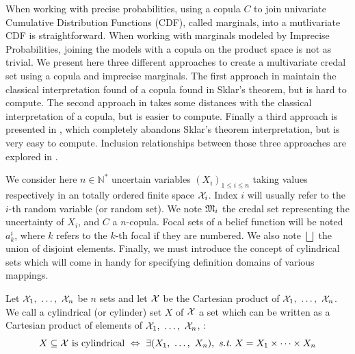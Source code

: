 When working with precise probabilities, using a copula $C$ to join univariate Cumulative Distribution Functions (CDF), called marginals, into a mutlivariate CDF is straightforward. When working with marginals modeled by Imprecise Probabilities, joining the models with a copula on the product space is not as trivial. We present here three different approaches to create a multivariate credal set using a copula and imprecise marginals. The first approach in  maintain the classical interpretation found of a copula found in Sklar's theorem, but is hard to compute. The second approach in  takes some distances with the classical interpretation of a copula, but is easier to compute. Finally a third approach is presented in , which completely abandons Sklar's theorem interpretation, but is very easy to compute. Inclusion relationships between those three approaches are explored in  .

We consider here $n\in\mathbb{N}^*$ uncertain variables $(X_i)_{1\leqslant i\leqslant n}$ taking values respectively in an totally ordered finite space $\mathcal{X}_i$. Index $i$ will usually refer to the $i$-th random variable (or random set). We note $\mathfrak{M}_i$ the credal set representing the uncertainty of $X_i$, and $C$ a $n$-copula. Focal sets of a belief function will be noted $a^i_k$, where $k$ refers to the $k$-th focal if they are numbered. We also note $\bigsqcup$ the union of disjoint elements. Finally, we must introduce the concept of cylindrical sets which will come in handy for specifying definition domains of various mappings. 
\begin{definition}
    Let $\mathcal{X}_1 , ~\dots, ~ \mathcal{X}_n$ be $n$ sets and let $\mathcal{X}$ be the Cartesian product of $\mathcal{X}_1 , ~\dots, ~ \mathcal{X}_n$. We call a cylindrical (or cylinder) set $X$ of $\mathcal{X}$ a set which can be written as a Cartesian product of elements of $\mathcal{X}_1 , ~\dots, ~ \mathcal{X}_n$, \ie:
    \begin{equation}
        X\subseteq\X \text{ is cylindrical} ~\Leftrightarrow~ \exists (X_1 \enum X_n),~\st~X=X_1\tdt X_n \label{eq:cylindrical_sets}
    \end{equation}
\end{definition}

